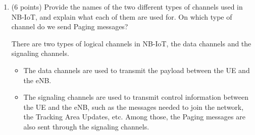 \documentclass[12pt]{article}
\begin{document}
\begin{ejercicio}[15 points]
\begin{enumerate}[label=\alph*)]
\begin{enumerate}[label=\roman*)]
                In addition, since the bicycles can be located in an underground parking lot, NB-IoT is a better option than \verb|802.15.4|, since it has better penetration in buildings and underground areas.
            \end{enumerate}
            \item (6 points) Provide the names of the two different types of channels used in NB-IoT, and explain what each of them are used for. On which type of channel do we send Paging messages?
            
            There are two types of logical channels in NB-IoT, the data channels and the signaling channels.
            \begin{itemize}
                \item The data channels are used to transmit the payload between the UE and the eNB.
                \item The signaling channels are used to transmit control information between the UE and the eNB, such as the messages needed to join the network, the Tracking Area Updates, etc. Among those, the Paging messages are also sent through the signaling channels.
            \end{itemize}
        \end{enumerate}
    \end{ejercicio}

    \newpage
\end{document}
